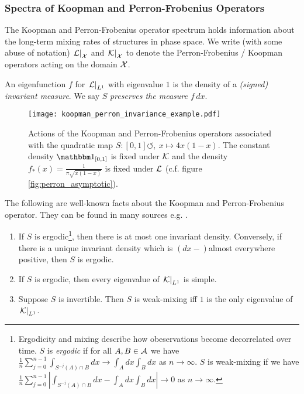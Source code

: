 \subsubsection{Spectra of Koopman and Perron-Frobenius Operators}

The Koopman and Perron-Frobenius operator spectrum holds information about the long-term 
mixing rates of structures in phase space. We write (with some abuse of notation) 
$\left. \mathcal{L} \right|_{\mathcal{X}}$ and $\left. \mathcal{K} \right|_{\mathcal{X}}$ to denote the 
Perron-Frobenius / Koopman operators acting on the domain $\mathcal{X}$. 

\begin{definition}
    An eigenfunction $f$ for $\left. \mathcal{L} \right|_{L^1}$ with eigenvalue $1$ is the 
    density of a \emph{(signed) invariant measure}. We say $S$ \emph{preserves the 
    measure $f\,dx$}. 
\end{definition}

\begin{figure}
    \centering
    \texttt{[image: koopman\_perron\_invariance\_example.pdf]}
    \caption{
        Actions of the Koopman and Perron-Frobenius operators associated with the quadratic 
        map $S : [0, 1] \circlearrowleft,\ x \mapsto 4 x (1 - x)$. The constant density 
        $\bbone_{[0, 1]}$ is fixed under $\mathcal{K}$ and the density 
        $f_* (x) = \frac{1}{\pi \sqrt{ x (1 - x) }}$ is fixed under $\mathcal{L}$ (c.f. figure 
        \ref{fig:perron_asymptotic}). 
    }\label{fig:quadratic_eigs}
\end{figure}

The following are well-known facts about the Koopman and Perron-Frobenius operator. They 
can be found in many sources e.g. \cite{lasotamackey}. 

\begin{theorem}
    \begin{enumerate}
        \item If $S$ is ergodic\footnote{Ergodicity and mixing describe how obeservations 
            become decorrelated over time. $S$ is \emph{ergodic} if for all $A, B \in \mathcal{A}$ 
            we have $\frac{1}{n}\sum_{j=0}^{n-1} \int_{ S^{-j} (A) \cap B } dx \to 
            \int_A dx \int_B dx$ as $n \to \infty$. $S$ is weak-mixing if we have 
            $\frac{1}{n}\sum_{j=0}^{n-1} \left| \int_{ S^{-j} (A) \cap B } dx 
            - \int_A dx \int_B dx \right| \to 0$ as $n \to \infty$. },
            then there is at most one invariant density. Conversely, if there is a unique 
            invariant density which is $(dx-)$almost everywhere positive, then $S$ is 
            ergodic. 
        \item If $S$ is ergodic, then every eigenvalue of $\left. \mathcal{K} \right|_{L^1}$ 
            is simple. 
        \item Suppose $S$ is invertible. Then $S$ is weak-mixing iff $1$ is the only 
            eigenvalue of $\left. \mathcal{K} \right|_{L^1}$. 
    \end{enumerate}
\end{theorem}

